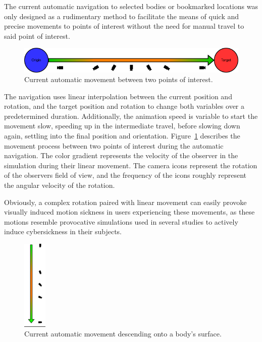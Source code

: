 The current automatic navigation to selected bodies or bookmarked locations was only designed as a rudimentary method
to facilitate the means of quick and precise movements to points of interest without the need for manual travel to
said point of interest.

\begin{figure}[h]
    \centering
    \includegraphics[width=\textwidth]{content/3_current_state/img/OldAutomaticNavigation}
    \caption{Current automatic movement between two points of interest.}
    \label{fig:old-auto-nav}
\end{figure}

The navigation uses linear interpolation between the current position and rotation, and the target position and
rotation to change both variables over a predetermined duration.
Additionally, the animation speed is variable to start the movement slow, speeding up in the intermediate travel,
before slowing down again, settling into the final position and orientation.
Figure~\ref{fig:old-auto-nav} describes the movement process between two points of interest during the automatic
navigation.
The color gradient represents the velocity of the observer in the simulation during their linear movement.
The camera icons represent the rotation of the observers field of view, and the frequency of the icons roughly
represent the angular velocity of the rotation.

Obviously, a complex rotation paired with linear movement can easily provoke visually induced motion sickness in
users experiencing these movements, as these motions resemble provocative simulations used in several studies to
actively induce cybersickness in their subjects.


\begin{figure}
    \centering
    \includegraphics[width=0.1\textwidth]{content/3_current_state/img/OldAutomaticNavigation_Landing}
    \caption{Current automatic movement descending onto a body's surface.}
    \label{fig:old-auto-nav-descend}
\end{figure}

